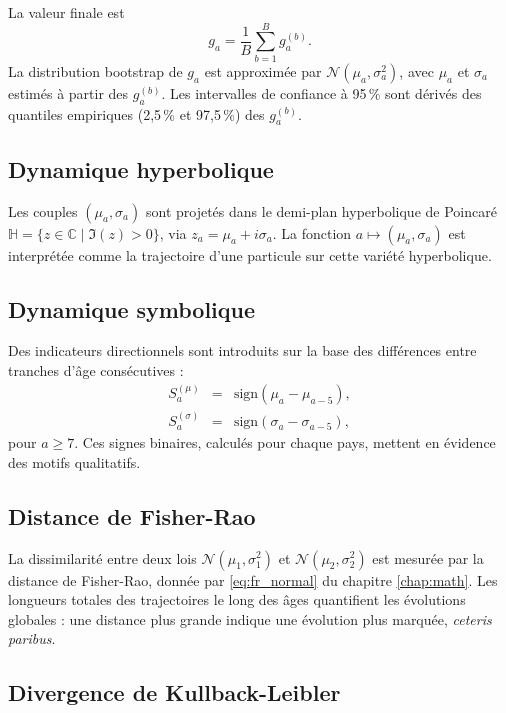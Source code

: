 La valeur finale est
\[
g_a = \frac{1}{B} \sum_{b=1}^B g_a^{(b)}.
\]
La distribution bootstrap de $g_a$ est approximée par $\mathcal{N}(\mu_a, \sigma_a^2)$, avec $\mu_a$ et $\sigma_a$ estimés à partir des $g_a^{(b)}$. Les intervalles de confiance à 95\,\% sont dérivés des quantiles empiriques (2,5\,\% et 97,5\,\%) des $g_a^{(b)}$.

\subsection{Dynamique hyperbolique}

Les couples $(\mu_a, \sigma_a)$ sont projetés dans le demi-plan hyperbolique de Poincaré $\mathbb{H} = \{ z \in \mathbb{C} \mid \Im(z) > 0 \}$, via $z_a = \mu_a + i \sigma_a$. La fonction $a \mapsto (\mu_a, \sigma_a)$ est interprétée comme la trajectoire d'une particule sur cette variété hyperbolique.

\subsection{Dynamique symbolique}

Des indicateurs directionnels sont introduits sur la base des différences entre tranches d'âge consécutives :
\begin{eqnarray}
	S_a^{(\mu)} &=& \mathrm{sign}(\mu_a - \mu_{a-5}), \\
	S_a^{(\sigma)} &=& \mathrm{sign}(\sigma_a - \sigma_{a-5}),
\end{eqnarray}
pour $a \geq 7$. Ces signes binaires, calculés pour chaque pays, mettent en évidence des motifs qualitatifs.

\subsection{Distance de Fisher-Rao}

La dissimilarité entre deux lois $\mathcal{N}(\mu_1, \sigma_1^2)$ et $\mathcal{N}(\mu_2, \sigma_2^2)$ est mesurée par la distance de Fisher-Rao, donnée par \eqref{eq:fr_normal} du chapitre \ref{chap:math}. Les longueurs totales des trajectoires le long des âges quantifient les évolutions globales : une distance plus grande indique une évolution plus marquée, \emph{ceteris paribus}.

\subsection{Divergence de Kullback-Leibler}

